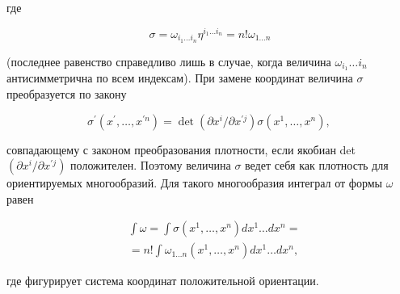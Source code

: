 \documentclass[10pt]{article}
\begin{document}
где



\[

\sigma=\omega_{i_{1} \ldots i_{n}} \eta^{i_{1} \ldots i_{n}}=n ! \omega_{1 \ldots n}

\]



(последнее равенство справедливо лишь в случае, когда величина $\omega_{i_{1}} \ldots i_{n}$ антисимметрична по всем индексам). При замене координат величина $\sigma$ преобразуется по закону



\[

\sigma^{\prime}\left(x^{\prime}, \ldots, x^{\prime n}\right)=\operatorname{det}\left(\partial x^{i} / \partial x^{\prime j}\right) \sigma\left(x^{1}, \ldots, x^{n}\right) \text {, }

\]



совпадающему с законом преобразования плотности, если якобиан det $\left(\partial x^{i} / \partial x^{\prime j}\right)$ положителен. Поэтому величина $\sigma$ ведет себя как плотность для ориентируемых многообразий. Для такого многообразия интеграл от формы $\omega$ равен



\[

\begin{aligned}

& \int \omega=\int \sigma\left(x^{1}, \ldots, x^{n}\right) d x^{1} \ldots d x^{n}= \\

& =n ! \int \omega_{1 \ldots n}\left(x^{1}, \ldots, x^{n}\right) d x^{1} \ldots d x^{n},

\end{aligned}

\]



где фигурирует система координат положительной ориентации.
\end{document}
